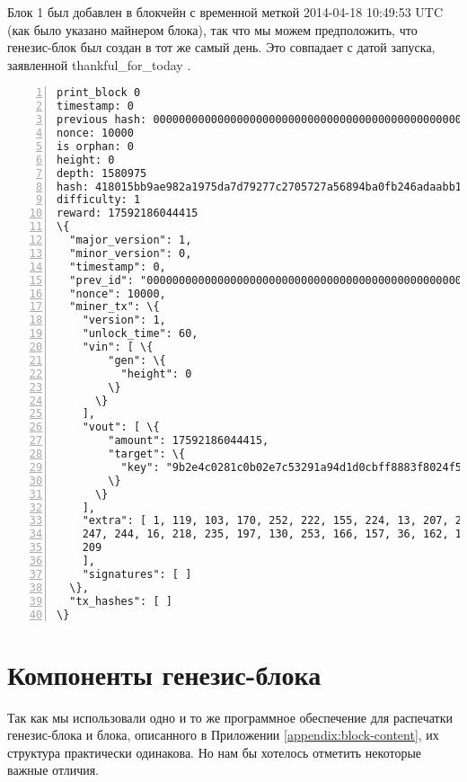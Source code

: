 \begin{appendices}
Блок 1 был добавлен в блокчейн с временной меткой 2014-04-18 10:49:53 UTC (как было указано майнером блока), так что мы можем предположить, что генезис-блок был создан в тот же самый день. Это совпадает с датой запуска, заявленной thankful\_for\_today \cite{bitmonero-launched}.

\begin{Verbatim}[commandchars=\\\{\}, numbers=left]
print_block 0
timestamp: 0
previous hash: 0000000000000000000000000000000000000000000000000000000000000000
nonce: 10000
is orphan: 0
height: 0
depth: 1580975
hash: 418015bb9ae982a1975da7d79277c2705727a56894ba0fb246adaabb1f4632e3
difficulty: 1
reward: 17592186044415
\{
  "major_version": 1,
  "minor_version": 0,
  "timestamp": 0,
  "prev_id": "0000000000000000000000000000000000000000000000000000000000000000",
  "nonce": 10000,
  "miner_tx": \{
    "version": 1,
    "unlock_time": 60,
    "vin": [ \{
        "gen": \{
          "height": 0
        \}
      \}
    ],
    "vout": [ \{
        "amount": 17592186044415,
        "target": \{
          "key": "9b2e4c0281c0b02e7c53291a94d1d0cbff8883f8024f5142ee494ffbbd088071"
        \}
      \}
    ],
    "extra": [ 1, 119, 103, 170, 252, 222, 155, 224, 13, 207, 208, 152, 113, 94, 188, 
    247, 244, 16, 218, 235, 197, 130, 253, 166, 157, 36, 162, 142, 157, 11, 200, 144, 
    209
    ],
    "signatures": [ ]
  \},
  "tx_hashes": [ ]
\}
\end{Verbatim}



\section*{Компоненты генезис-блока}

Так как мы использовали одно и то же программное обеспечение для распечатки генезис-блока и блока, описанного в Приложении \ref{appendix:block-content}, их структура практически одинакова. Но нам бы хотелось отметить некоторые важные отличия.


\end{appendices}
